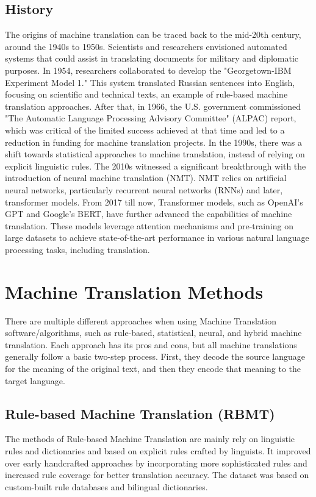 \documentclass[sigconf]{acmart}
\begin{document}
    \subsection{History}
    The origins of machine translation can be traced back to the mid-20th century, around the 1940s to 1950s. Scientists and researchers envisioned automated systems that could assist in translating documents for military and diplomatic purposes. In 1954, researchers collaborated to develop the "Georgetown-IBM Experiment Model 1." This system translated Russian sentences into English, focusing on scientific and technical texts, an example of rule-based machine translation approaches. After that, in 1966, the U.S. government commissioned "The Automatic Language Processing Advisory Committee" (ALPAC) report, which was critical of the limited success achieved at that time and led to a reduction in funding for machine translation projects. In the 1990s, there was a shift towards statistical approaches to machine translation, instead of relying on explicit linguistic rules. The 2010s witnessed a significant breakthrough with the introduction of neural machine translation (NMT). NMT relies on artificial neural networks, particularly recurrent neural networks (RNNs) and later, transformer models. From 2017 till now, Transformer models, such as OpenAI's GPT and Google's BERT, have further advanced the capabilities of machine translation. These models leverage attention mechanisms and pre-training on large datasets to achieve state-of-the-art performance in various natural language processing tasks, including translation.

\section{Machine Translation Methods}
    There are multiple different approaches when using Machine Translation software/algorithms, such as rule-based, statistical, neural, and hybrid machine translation. Each approach has its pros and cons, but all machine translations generally follow a basic two-step process. First, they decode the source language for the meaning of the original text, and then they encode that meaning to the target language\cite{Amazon_MT}.
    
    \subsection{Rule-based Machine Translation (RBMT)}
        The methods of Rule-based Machine Translation are mainly rely on linguistic rules and dictionaries and based on explicit rules crafted by linguists. It improved over early handcrafted approaches by incorporating more sophisticated rules and increased rule coverage for better translation accuracy. The dataset was based on custom-built rule databases and bilingual dictionaries. 
        
\end{document}
